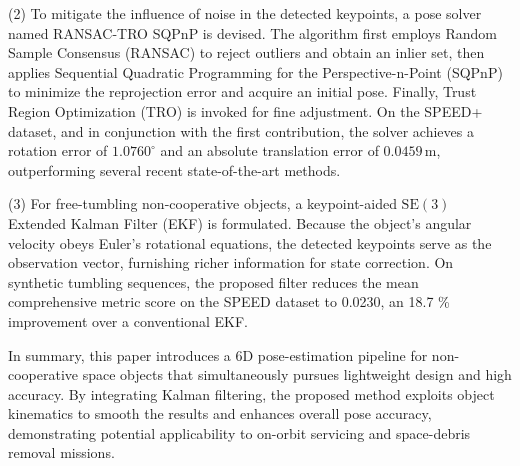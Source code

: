 (2) To mitigate the influence of noise in the detected keypoints, a pose solver named RANSAC-TRO SQPnP is devised. The algorithm first employs Random Sample Consensus (RANSAC) to reject outliers and obtain an inlier set, then applies Sequential Quadratic Programming for the Perspective-n-Point (SQPnP) to minimize the reprojection error and acquire an initial pose. Finally, Trust Region Optimization (TRO) is invoked for fine adjustment. On the SPEED+ dataset, and in conjunction with the first contribution, the solver achieves a rotation error of $1.0760^{\circ}$ and an absolute translation error of $0.0459\,\text{m}$, outperforming several recent state-of-the-art methods.

(3) For free-tumbling non-cooperative objects, a keypoint-aided $\mathrm{SE}(3)$ Extended Kalman Filter (EKF) is formulated. Because the object’s angular velocity obeys Euler’s rotational equations, the detected keypoints serve as the observation vector, furnishing richer information for state correction. On synthetic tumbling sequences, the proposed filter reduces the mean comprehensive metric $\mathrm{score}$ on the SPEED dataset to 0.0230, an 18.7 \% improvement over a conventional EKF.

In summary, this paper introduces a 6D pose-estimation pipeline for non-cooperative space objects that simultaneously pursues lightweight design and high accuracy. By integrating Kalman filtering, the proposed method exploits object kinematics to smooth the results and enhances overall pose accuracy, demonstrating potential applicability to on-orbit servicing and space-debris removal missions.


